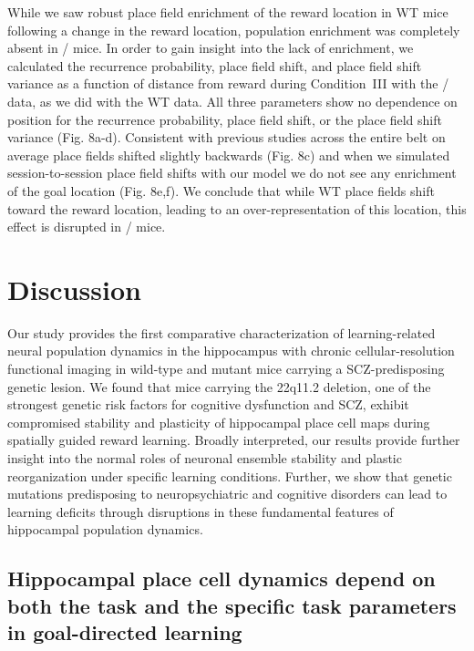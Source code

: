 While we saw robust place field enrichment of the reward location in WT mice following a change in the reward location, population enrichment was completely absent in \df/ mice. In order to gain insight into the lack of enrichment, we calculated the recurrence probability, place field shift, and place field shift variance as a function of distance from reward during Condition~III with the \df/ data, as we did with the WT data. All three parameters show no dependence on position for the recurrence probability, place field shift, or the place field shift variance (Fig. 8a-d). Consistent with previous studies \citep{Mehta1997} across the entire belt on average place fields shifted slightly backwards (Fig. 8c) and when we simulated session-to-session place field shifts with our model we do not see any enrichment of the goal location (Fig. 8e,f). We conclude that while WT place fields shift toward the reward location, leading to an over-representation of this location, this effect is disrupted in \df/ mice.

\section{Discussion}

Our study provides the first comparative characterization of learning-related neural population dynamics in the hippocampus with chronic cellular-resolution functional imaging in wild-type and mutant mice carrying a SCZ-predisposing genetic lesion.  We found that mice carrying the 22q11.2 deletion, one of the strongest genetic risk factors for cognitive dysfunction and SCZ, exhibit compromised stability and plasticity of hippocampal place cell maps during spatially guided reward learning. Broadly interpreted, our results provide further insight into the normal roles of neuronal ensemble stability and plastic reorganization under specific learning conditions. Further, we show that genetic mutations predisposing to neuropsychiatric and cognitive disorders can lead to learning deficits through disruptions in these fundamental features of hippocampal population dynamics. 

\subsection{Hippocampal place cell dynamics depend on both the task and the specific task parameters in goal-directed learning}

